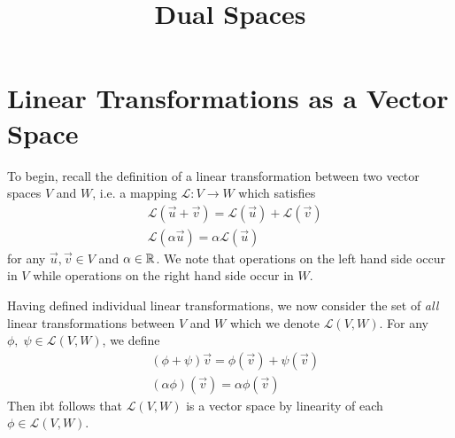 

\title{Dual Spaces}


\maketitle

\section*{Linear Transformations as a Vector Space}
To begin, recall the definition of a linear transformation between two vector spaces $V$
and $W$, i.e. a mapping $\mathscr{L}:V\to W$ which satisfies
\begin{align}
  &\mathscr{L}\left(\vec{u}+\vec{v}\right) = \mathscr{L}\left( \vec{u} \right)+\mathscr{L}\left( \vec{v} \right) \\
  &\mathscr{L}\left( \alpha \vec{u} \right) = \alpha\mathscr{L}(\vec{u})
\end{align}
for any $\vec{u},\vec{v} \in V$ and $\alpha \in \mathbb{R}$. We note that operations on
the left hand side occur in $V$ while operations on the right hand side occur in $W$.

Having defined individual linear transformations, we now consider the set of
\textit{all} linear transformations between $V$ and $W$ which we denote
$\mathscr{L}(V,W)$. For any $\phi, \;\psi\in \mathscr{L}(V,W)$, we define
\begin{align}
  &(\phi+\psi)\vec{v} = \phi(\vec{v}) + \psi(\vec{v})\\
  &(\alpha \phi)(\vec{v}) = \alpha\phi(\vec{v})
\end{align}
Then ibt follows that $\mathscr{L}(V,W)$ is a vector space by linearity of each $\phi\in\mathscr{L}(V,W)$.































